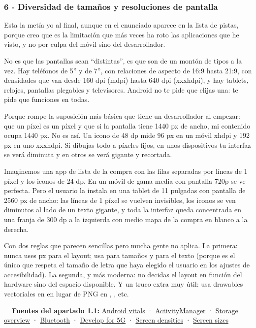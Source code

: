 \subsubsection*{6 - Diversidad de tamaños y resoluciones de pantalla}

Esta la metía yo al final, aunque en el enunciado aparece en la lista de pistas, porque creo que es la limitación que más veces ha roto las aplicaciones que he visto, y no por culpa del móvil sino del desarrollador.

No es que las pantallas sean \enquote{distintas}, es que son de un montón de tipos a la vez. Hay teléfonos de 5'' y de 7'', con relaciones de aspecto de 16:9 hasta 21:9, con densidades que van desde 160 dpi (mdpi) hasta 640 dpi (xxxhdpi), y hay tablets, relojes, pantallas plegables y televisores. Android no te pide que elijas una: te pide que funciones en todas.

Porque rompe la suposición más básica que tiene un desarrollador al empezar: que un píxel es un píxel y que si la pantalla tiene 1440 px de ancho, mi contenido ocupa 1440 px. No es así. Un icono de 48 dp mide 96 px en un móvil xhdpi y 192 px en uno xxxhdpi. Si dibujas todo a píxeles fijos, en unos dispositivos tu interfaz se verá diminuta y en otros se verá gigante y recortada.

Imaginemos una app de lista de la compra con las filas separadas por líneas de 1 píxel y los iconos de 24 dp. En un móvil de gama media con pantalla 720p se ve perfecta. Pero el usuario la instala en una tablet de 11 pulgadas con pantalla de 2560 px de ancho: las líneas de 1 píxel se vuelven invisibles, los iconos se ven diminutos al lado de un texto gigante, y toda la interfaz queda concentrada en una franja de 300 dp a la izquierda con medio mapa de la compra en blanco a la derecha.

Con dos reglas que parecen sencillas pero mucha gente no aplica. La primera: nunca uses px para el layout; usa  para tamaños y  para el texto (porque  es el único que respeta el tamaño de letra que haya elegido el usuario en los ajustes de accesibilidad). La segunda, y más moderna: no decidas el layout en función del hardware sino del espacio disponible. Y un truco extra muy útil: usa drawables vectoriales en  en lugar de PNG en , , etc.

\begin{fuentesbox}
\textbf{\color{muted}\faBook\ \ Fuentes del apartado 1.1:}
\href{https://developer.android.com/topic/performance/vitals}{Android vitals} ·
\href{https://developer.android.com/reference/android/app/ActivityManager}{ActivityManager} ·
\href{https://developer.android.com/training/data-storage}{Storage overview} ·
\href{https://developer.android.com/develop/connectivity/bluetooth}{Bluetooth} ·
\href{https://developer.android.com/develop/connectivity/5g}{Develop for 5G} ·
\href{https://developer.android.com/training/multiscreen/screendensities}{Screen densities} ·
\href{https://developer.android.com/training/multiscreen/screensizes}{Screen sizes}
\end{fuentesbox}%
